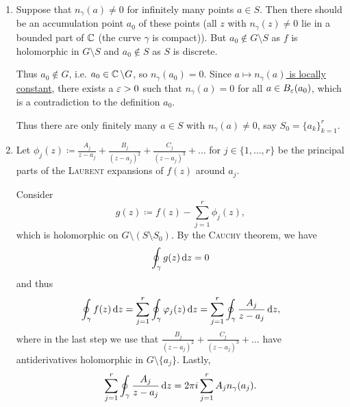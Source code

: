 \documentclass[a4paper,english]{article}
\begin{document}
\begin{pr}
    \begin{enumerate}
        \item 
        Suppose that $n_{\gamma}(a) \ne 0$ for infinitely many points $a \in S$.
        Then there should be an accumulation point $a_0$ of these points (all $z$ with $n_{\gamma}(z) \ne 0$ lie in a bounded part of $\operatorname{\mathbb{C}}$ (the curve $\gamma$ is compact)).
        But $a_0 \not\in G \setminus S$ as $f$ is holomorphic in $G \setminus S$ and $a_0 \not\in S$ as $S$ is discrete.
        
        Thus $a_0 \not\in G$, i.e. $a_0 \in \operatorname{\mathbb{C}} \setminus G$, so $n_{\gamma}(a_0) = 0$.
        Since \hyperref[lemma:locallyconstant]{$a \mapsto n_{\gamma}(a)$ is locally constant}, there exists a $\varepsilon > 0$ such that $n_{\gamma}(a) = 0$ for all $a \in B_{\varepsilon}(a_0)$, which is a contradiction to the definition $a_0$.
        
        Thus there are only finitely many $a \in S$ with $n_{\gamma}(a) \ne 0$, say $S_0 = \{ a_k \}_{k = 1}^{r}$.
        
        \item
        Let $\phi_j(z) \coloneqq \frac{A_j}{z - a_j} + \frac{B_j}{(z - a_j)^2} + \frac{C_j}{(z - a_j)^3} + \ldots$ for $j \in \{1, \ldots, r \}$ be the principal parts of the \textsc{Laurent} expansions of $f(z)$ around $a_j$.
        
        Consider
        \begin{equation*}
            g(z)
            \coloneqq f(z) - \sum_{j = 1}^{r} \phi_j(z),
        \end{equation*}
        which is holomorphic on $G \setminus (S \setminus S_0)$.
        By the \textsc{Cauchy} theorem, we have
        \begin{equation*}
            \oint_{\gamma} g(z) \mathop{}\!\mathrm{d}{z} = 0
        \end{equation*}
        and thus
        \begin{equation*}
            \oint_{\gamma} f(z) \mathop{}\!\mathrm{d}{z}
            = \sum_{j = 1}^{r} \oint_{\gamma} \varphi_j(z) \mathop{}\!\mathrm{d}{z}
            = \sum_{j = 1}^{r} \oint_{\gamma} \frac{A_j}{z - a_j} \mathop{}\!\mathrm{d}{z},
        \end{equation*}
        where in the last step we use that $\frac{B_j}{(z - a_j)^2} + \frac{C_j}{(z - a_j)^3} + \ldots$ have antiderivatives holomorphic in $G \setminus \{ a_j \}$.
        Lastly, 
        \begin{equation*}
            \sum_{j = 1}^{r} \oint_{\gamma} \frac{A_j}{z - a_j} \mathop{}\!\mathrm{d}{z}
            = 2 \pi i \sum_{j = 1}^{r} A_j n_{\gamma}(a_j).
        \end{equation*}
    \end{enumerate}
\end{pr}
\end{document}
